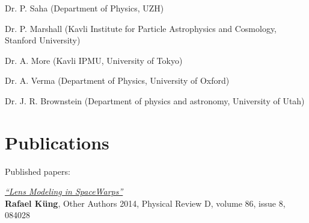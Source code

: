 \documentclass[margin,line]{resume}
\begin{document}
\begin{resume}
\begin{list2}
  \item Dr. P. Saha (Department of Physics, UZH)
  \item Dr. P. Marshall (Kavli Institute for Particle Astrophysics and Cosmology, Stanford University)
  \item Dr. A. More (Kavli IPMU, University of Tokyo)
  \item Dr. A. Verma (Department of Physics, University of Oxford)
  \item Dr. J. R. Brownstein (Department of physics and astronomy, University of Utah)
\end{list2}



\section{\mysidestyle Publications}

Published papers:

\begin{list2}
  \item
    {\small \emph{\href{http://arxiv.org/abs/1234.1234}{``Lens Modeling in SpaceWarps''}}}\\
    {\bf Rafael Küng}, Other Authors
    2014,
    Physical Review D, volume 86, issue 8, 084028
\end{list2}






\end{resume}
\end{document}
